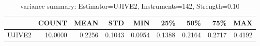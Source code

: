 \begin{table}[ht]
\centering
\caption{variance summary: Estimator=UJIVE2, Instruments=142, Strength=0.10}
\begin{tabular}{lrrrrrrrr}
\toprule
 & COUNT & MEAN & STD & MIN & 25\% & 50\% & 75\% & MAX \\
\midrule
UJIVE2 & 10.0000 & 0.2256 & 0.1043 & 0.0954 & 0.1388 & 0.2164 & 0.2717 & 0.4192 \\
\bottomrule
\end{tabular}
\end{table}
